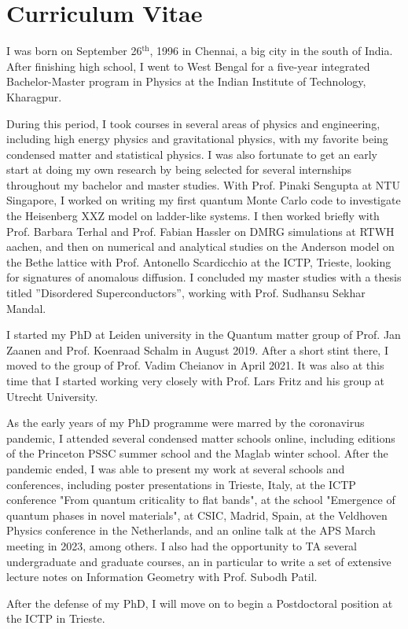 \newpage
\thispagestyle{empty}

\chapter*{Curriculum Vitae} %
\label{Curriculum Vitae}

I was born on September 26${}^{\text{th}}$, 1996 in Chennai, a big city in the south of India. After finishing high school, I went to West Bengal for a five-year integrated Bachelor-Master program in Physics at the Indian Institute of Technology, Kharagpur.
\par
During this period, I took courses in several areas of physics and engineering, including high energy physics and gravitational physics, with my favorite being condensed matter and statistical physics. I was also fortunate to get an early start at doing my own research by being selected for several internships throughout my bachelor and master studies. With Prof. Pinaki Sengupta at NTU Singapore, I worked on writing my first quantum Monte Carlo code to investigate the Heisenberg XXZ model on ladder-like systems. I then worked briefly with Prof. Barbara Terhal and Prof. Fabian Hassler on DMRG simulations at RTWH aachen, and then on numerical and analytical studies on the Anderson model on the Bethe lattice with Prof. Antonello Scardicchio at the ICTP, Trieste, looking for signatures of anomalous diffusion. I concluded my master studies with a thesis titled ''Disordered Superconductors'', working with Prof. Sudhansu Sekhar Mandal. 
\par
I started my PhD at Leiden university in the Quantum matter group of Prof. Jan Zaanen and Prof. Koenraad Schalm in August 2019. After a short stint there, I moved to the group of Prof. Vadim Cheianov in April 2021. It was also at this time that I started working very closely with Prof. Lars Fritz and his group at Utrecht University. 
\par
As the early years of my PhD programme were marred by the coronavirus pandemic, I attended several condensed matter schools online, including editions of the Princeton PSSC summer school and the Maglab winter school. After the pandemic ended, I was able to present my work at several schools and conferences, including poster presentations in Trieste, Italy, at the ICTP conference "From quantum criticality to flat bands", at the school "Emergence of quantum phases in novel materials", at CSIC, Madrid, Spain, at the Veldhoven Physics conference in the Netherlands, and an online talk at the APS March meeting in 2023, among others. I also had the opportunity to TA several undergraduate and graduate courses, an in particular to write a set of extensive lecture notes on Information Geometry with Prof. Subodh Patil. 
\par
After the defense of my PhD, I will move on to begin a Postdoctoral position at the ICTP in Trieste. 

\newpage
\thispagestyle{empty}